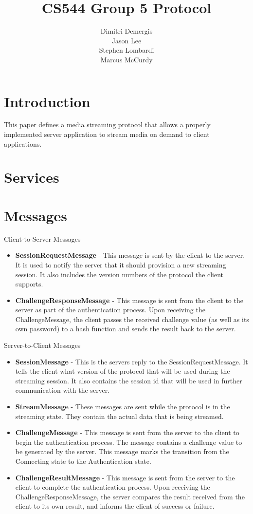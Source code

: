 \documentclass[12pt,letterpaper,titlepage]{article}
\author{Dimitri Demergis \\ Jason Lee \\ Stephen Lombardi \\ Marcus McCurdy}
\title{CS544 Group 5 Protocol}
\begin{document}
\maketitle

\section{Introduction}
This paper defines a media streaming protocol that allows a properly implemented server application to stream media on demand to client applications.  
\section{Services}

\section{Messages}
Client-to-Server Messages
\begin{itemize}
\item \textbf{SessionRequestMessage} - This message is sent by the client to the server. It is used to notify the server that it should provision a new streaming session. It also includes the version numbers of the protocol the client supports.
\item \textbf{ChallengeResponseMessage} - This message is sent from the client to the server as part of the authentication process.  Upon receiving the ChallengeMessage, the client passes the received challenge value (as well as its own password) to a hash function and sends the result back to the server.
\end{itemize}
Server-to-Client Messages
\begin{itemize}
\item\textbf{SessionMessage} - This is the servers reply to the SessionRequestMessage. It tells the client what version of the protocol that will be used during the streaming session. It also contains the session id that will be used in further communication with the server.
\item \textbf{StreamMessage} - These messages are sent while the protocol is in the streaming state. They contain the actual data that is being streamed.
\item \textbf{ChallengeMessage} - This message is sent from the server to the client to begin the authentication process.  The message contains a challenge value to be generated by the server.  This message marks the transition from the Connecting state to the Authentication state. 	
\item \textbf{ChallengeResultMessage} - This message is sent from the server to the client to complete the authentication process.  Upon receiving the ChallengeResponseMessage, the server compares the result received from the client to its own result, and informs the client of success or failure.
\end{itemize}
\end{document}
